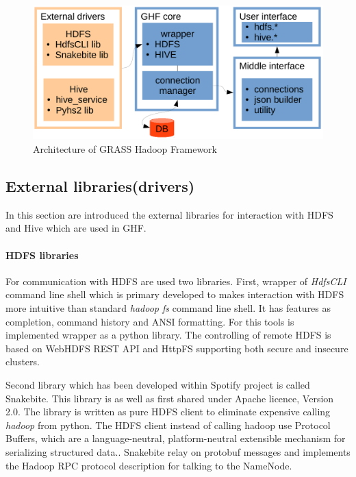 \documentclass[a4paper,12pt,oneside]{report}
\begin{document}
	\begin{figure}[!htbp]
		\centering
		\includegraphics[width=1\textwidth]{./img/implementation.pdf}
		\caption[Architecture of GHF]{\centering Architecture of GRASS Hadoop
			Framework}
	\end{figure} 
	
	
	\subsection{External libraries(drivers)}
	In this section are introduced the external libraries for interaction with HDFS
	and Hive which are used in GHF. 
	
	\paragraph{HDFS libraries}
	For communication with HDFS are used two libraries. First, wrapper of
	\textit{HdfsCLI} command line shell which is primary developed to makes
	interaction with HDFS more intuitive than standard \textit{hadoop fs} command
	line shell. It has features as completion, command history and ANSI formatting.
	For this tools is implemented wrapper as a python library. The controlling of
	remote HDFS is based on WebHDFS REST API and HttpFS supporting both secure and
	insecure clusters.
	
	Second library which has been developed within Spotify project is called
	Snakebite. This library is as well as first shared under Apache licence, Version
	2.0. The library is written as pure HDFS client to eliminate expensive calling
	\textit{hadoop} from python. The HDFS client instead of calling hadoop use
	Protocol Buffers, which  are a language-neutral, platform-neutral extensible
	mechanism for serializing structured data.\cite{protobuf}. Snakebite relay on
	protobuf messages and implements the Hadoop RPC protocol description for talking
	to the NameNode.\cite{snakebite}
	
\end{document}
